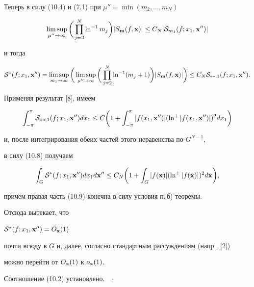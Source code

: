 Теперь в силу (10.4) и (7.1) при $\mu''=\min (m_2,\dotsc,m_N)$


$$


\limsup_{\mu''\to\infty}\bigg(\prod_{j=2}^N\ln^{-1}m_j\bigg)


|S_{{\bold m}}(f,{\bold x})|\le C_N |{\cal S}_{m_1}(f;x_1,{\bold x}'')|


$$


и тогда


\begin{equation}


{\cal S}^{*}(f;x_1,{\bold x}'') =\limsup_{m_1\to\infty}


\bigg(\limsup_{\mu'' \to \infty}\bigg( \prod_{j=2}^N\ln^{-1}(m_j+1)\bigg)


|S_{{\bold m}}(f,{\bold x})|\bigg)\le


C_N {\cal S}_{**,1}(f;x_1,{\bold x}'').


\end{equation}


Применяя результат [8], имеем


$$


\int_{-\pi}^{\pi} {\cal S}_{**,1}(f;x_1,{\bold x}'')dx_1\le


C\bigg(1+\int_{-\pi}^{\pi}|f(x_1,{\bold x}'')|(\ln^+


|f(x_1,{\bold x}'')|)^2 dx_1\bigg)


$$


и, после интегрирования обеих частей этого неравенства по $G^{N-1}$,


в силу (10.8) получаем


\begin{equation}


\int_G {\cal S}^*(f;x_1,{\bold x}'')dx_1 d{\bold x}''\le


C_N\bigg(1+\int_G |f({\bold x})|(\ln^+ |f({\bold x})|)^2 d{\bold x}\bigg),


\end{equation}


причем правая часть (10.9) конечна в силу условия п.\,б) теоремы.


Отсюда вытекает, что 


${\cal S}^{*}(f;x_1,{\bold x}'')=O_{\bold x}(1)$


почти всюду в $G$ и, далее, согласно стандартным рассуждениям (напр., [2])


можно перейти от $O_{\bold x}(1)$ к $ o_{\bold x}(1)$.


Соотношение (10.2) установлено.$\quad\square$









